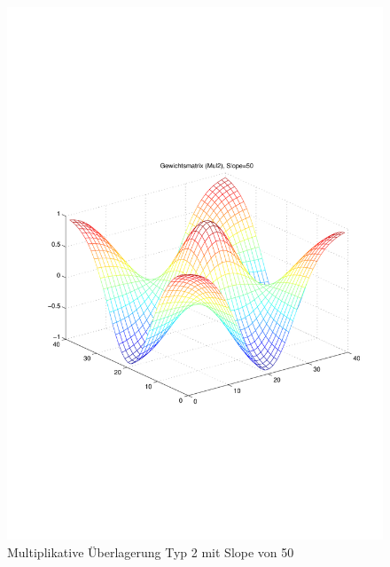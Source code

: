 \begin{figure}[hbt]
\begin{minipage}{0.5 \textwidth}
		\includegraphics[width=\textwidth]{./Bilder/Auswertung/Gewichtsmatrix/Gewichtsmatrix_Mul2_Slope_50}
		\caption{Multiplikative Überlagerung Typ 2 mit Slope von 50}
		\label{Mul250}
	\end{minipage}
\end{figure}

